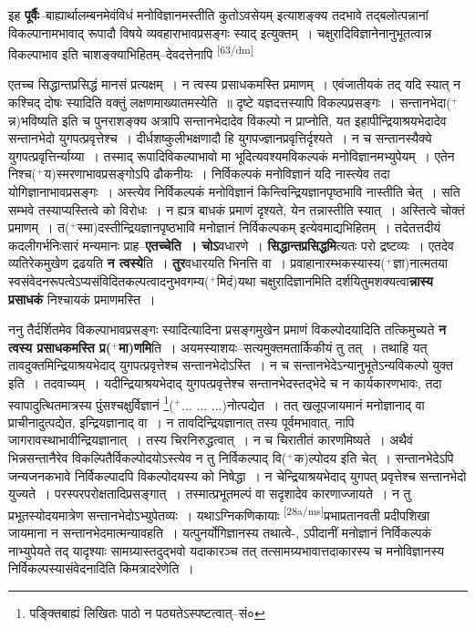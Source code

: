 \documentclass[article,12pt,a4paper]{memoir}
\newcommand{\add}[1]{($^{+}$#1)}
\begin{document}
	  \pstart इह \textbf{पूर्वैः}--बाह्यार्थालम्बनमेवंविधं मनोविज्ञानमस्तीति कुतोऽवसेयम् इत्याशङ्क्य तदभावे तद्बलोत्पन्नानां विकल्पानामभावाद् रूपादौ विषये व्यवहाराभावप्रसङ्गः स्याद् इत्युक्तम् । चक्षुरादिविज्ञानेनानुभूतत्वान्न विकल्पाभाव इति चाशङ्क्याभिहितम्--देवदत्तेनापि  \leavevmode\textsuperscript{\rmlatinfont\tiny [63/dm]} 
	  
	एतच्च सिद्धान्तप्रसिद्धं मानसं प्रत्यक्षम् । न त्वस्य प्रसाधकमस्ति प्रमाणम् । एवंजातीयकं तद् यदि स्यात् न कश्चिद् दोषः स्यादिति वक्तुं लक्षणमाख्यातमस्येति ॥ दृष्टे यज्ञदत्तस्यापि विकल्पप्रसङ्गः । सन्तानभेदा\add{न्न}भविष्यति इति च पुनराशङ्क्य अत्रापि सन्तानभेदादेव विकल्पो न प्राप्नोति, यत इहापीन्द्रियाश्रयभेदादेव सन्तानभेदो युगपत्प्रवृत्तेश्च । दीर्धशष्कुलीभक्षणादौ हि युगपज्ज्ञानप्रवृत्तिर्दृश्यते । न च सन्तानस्यैक्ये युगपत्प्रवृत्तिर्न्याय्या । तस्माद् रूपादिविकल्पाभावो मा भूदित्यवश्यमविकल्पकं मनोविज्ञानमभ्युपेयम् । एतेन निश्च\add{य}स्मरणाभावप्रसङ्गोऽपि ढौकनीयः । निर्विकल्पकं मनोविज्ञानं यदि नास्त्येव तदा योगिज्ञानाभावप्रसङ्गः । अस्त्येव निर्विकल्पकं मनोविज्ञानं किन्त्विन्द्रियज्ञानपृष्ठभावि नास्तीति चेत् । सति सम्भवे तस्याप्यस्तित्वे को विरोधः । न ह्यत्र बाधकं प्रमाणं दृश्यते, येन तन्नास्तीति स्यात् । अस्तित्वे चोक्तं प्रमाणम् । त\add{स्मा}दस्तीन्द्रियज्ञानपृष्ठभावि मनोज्ञानं निर्विकल्पकम् इत्येवमाद्यभिहितम् । तदेतत्तदीयं कदलीगर्भनिःसारं मन्यमानः प्राह--\textbf{एतच्चेति । चोऽ}वधारणे । \textbf{सिद्धान्तप्रसिद्धमि}त्यतः परो द्रष्टव्यः । एतदेव व्यतिरेकमुखेण द्रढयति \textbf{न त्वस्ये}ति । \textbf{तुर}वधारयति भिनत्ति वा । प्रवाहानारम्भकस्यास्य\add{ज्ञा}नात्मतया स्वसंवेदनरूपत्वेऽप्यसंविदितकल्पत्वादनुभवगम्य\add{मिदं}यथा चक्षुरादिज्ञानमिति दर्शयितुमशक्यत्वा\textbf{न्नास्य प्रसाधकं} निश्चायकं प्रमाणमस्ति ।
	\pend
      

	  \pstart ननु तैर्दर्शितमेव विकल्पाभावप्रसङ्गः स्यादित्यादिना प्रसङ्गमुखेन प्रमाणं विकल्पोदयादिति तत्किमुच्यते \textbf{न त्वस्य प्रसाधकमस्ति प्र\add{मा}णमि}ति । अयमस्याशयः--सत्यमुक्तमतार्किकीयं तु तत् । तथाहि यत् तावदुक्तमिन्द्रियाश्रयभेदाद् युगपत्प्रवृत्तेश्च सन्तानभेदोऽस्ति । न च सन्तानभेदेऽन्यानुभूतेऽन्यविकल्पो युक्त इति । तदवाच्यम् । यदीन्द्रियाश्रयभेदाद् युगपत्प्रवृत्तेश्च सन्तानभेदस्तद्भेदे च न कार्यकारणभावः, तदा स्वापादुत्थितमात्रस्य पुंसश्चक्षुर्विज्ञानं \footnote{पङ्क्तिबाह्यं लिखितः पाठो न पठ्यतेऽस्पष्टत्वात्--सं०}\add{... ... ...}नोत्पद्येत । तत् खलूपजायमानं मनोज्ञानाद् वा प्राचीनादुत्पद्येत, इन्द्रियज्ञानाद् वा । न तावदिन्द्रियज्ञानात् तस्य पूर्वमभावात्, नापि जागरावस्थाभावीन्द्रियज्ञानात् । तस्य चिरनिरुद्धत्वात् । न च चिरातीतं कारणमिष्यते । अथैवं भिन्नसन्तानैरेव विकल्पितैर्विकल्पोदयोऽस्त्येव न तु निर्विकल्पाद् वि\add{क}ल्पोदय इति चेत् । सन्तानभेदेऽपि जन्यजनकभावे निर्विकल्पादपि विकल्पोदयस्य को निषेद्धा । न चेन्द्रियाश्रयभेदाद् युगपत् प्रवृत्तेश्च सन्तानभेदो युज्यते । परस्परपरोक्षतादिप्रसङ्गात् । तस्मात्प्रभूतमल्पं वा सदृशादेव कारणाज्जायते । न तु प्रभूतस्योदयमात्रेण सन्तानभेदोऽभ्युपेतव्यः । यथाऽग्निकणिकायाः \leavevmode\textsuperscript{\rmlatinfont\tiny [28a/ms]}प्रभाप्रतानवती प्रदीपशिखा जायमाना न सन्तानभेदमात्मन्यावहति । यत्पुनर्योगिज्ञानस्य तथात्वे-, ऽपीदानीं मनोज्ञानं निर्विकल्पकं नाभ्युपेयते तद् यादृश्याः सामग्र्यास्तदुद्भवो यदाकारञ्च तत् तत्सामग्र्यभावात्तदाकारस्य च मनोविज्ञानस्य निर्विकल्पस्यासंवेदनादिति किमत्रादरेणेति ।
	\pend
      
\end{document}

